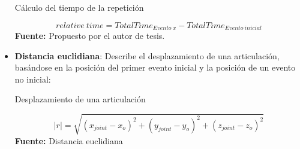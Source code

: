 \begin{itemize}
\begin{formula}[H]
	\centering
	\caption{C\'alculo del tiempo de la repetici\'on}
	\label{frm:relativeTime}
	\begin{equation}
	relative \: time = TotalTime_{Evento\: x}-TotalTime_{Evento\: inicial}
	\end{equation}
		\textbf{Fuente:} Propuesto por el autor de tesis.
\end{formula}
\item \textbf{Distancia euclidiana}: Describe el desplazamiento de una articulaci\'on, bas\'andose en la posici\'on del primer evento inicial y la posici\'on de un evento no inicial:
\begin{formula}[H]
	\centering
	\caption{Desplazamiento de una articulaci\'on}
	\label{frm:desplazaUser}
	\begin{equation}
|r|=\sqrt{(x_{joint}-x_{o})^{2}+(y_{joint}-y_{o})^{2}+(z_{joint}-z_{o})^{2}}
	\end{equation}
	\textbf{Fuente:} Distancia euclidiana \cite[p.~423]{ayres2001calculo}
\end{formula}  
\end{itemize}
